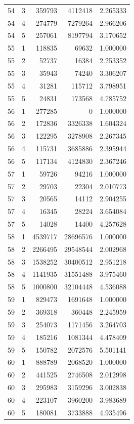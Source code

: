 \begin{longtable}{rrrrr}
54 & 3 & 359793 & 4112418 & 2.265333 \\
54 & 4 & 274779 & 7279264 & 2.966206 \\
54 & 5 & 257061 & 8197794 & 3.170652 \\
55 & 1 & 118835 & 69632 & 1.000000 \\
55 & 2 & 52737 & 16384 & 2.253352 \\
55 & 3 & 35943 & 74240 & 3.306207 \\
55 & 4 & 31281 & 115712 & 3.798951 \\
55 & 5 & 24831 & 173568 & 4.785752 \\
56 & 1 & 277285 & 0 & 1.000000 \\
56 & 2 & 172836 & 3326338 & 1.604324 \\
56 & 3 & 122295 & 3278908 & 2.267345 \\
56 & 4 & 115731 & 3685886 & 2.395944 \\
56 & 5 & 117134 & 4124830 & 2.367246 \\
57 & 1 & 59726 & 94216 & 1.000000 \\
57 & 2 & 29703 & 22304 & 2.010773 \\
57 & 3 & 20565 & 14112 & 2.904255 \\
57 & 4 & 16345 & 28224 & 3.654084 \\
57 & 5 & 14028 & 14400 & 4.257628 \\
58 & 1 & 4539717 & 28696576 & 1.000000 \\
58 & 2 & 2266495 & 29548544 & 2.002968 \\
58 & 3 & 1538252 & 30400512 & 2.951218 \\
58 & 4 & 1141935 & 31551488 & 3.975460 \\
58 & 5 & 1000800 & 32104448 & 4.536088 \\
59 & 1 & 829473 & 1691648 & 1.000000 \\
59 & 2 & 369318 & 360448 & 2.245959 \\
59 & 3 & 254073 & 1171456 & 3.264703 \\
59 & 4 & 185216 & 1081344 & 4.478409 \\
59 & 5 & 150782 & 2072576 & 5.501141 \\
60 & 1 & 888789 & 2068520 & 1.000000 \\
60 & 2 & 441525 & 2746508 & 2.012998 \\
60 & 3 & 295983 & 3159296 & 3.002838 \\
60 & 4 & 223107 & 3960200 & 3.983689 \\
60 & 5 & 180081 & 3733888 & 4.935496 \\

\end{longtable}
